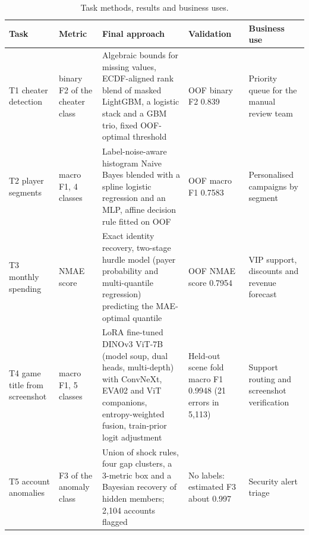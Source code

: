 \begin{table}[H]\centering\scriptsize
\captionsetup{justification=raggedright,singlelinecheck=false}

\begin{tabular}{@{}L{.10\linewidth}L{.12\linewidth}L{.29\linewidth}L{.17\linewidth}L{.21\linewidth}@{}}
\toprule
\textbf{Task} & \textbf{Metric} & \textbf{Final approach} & \textbf{Validation} & \textbf{Business use} \\
\midrule
T1 cheater detection & binary F2 of the cheater class & Algebraic bounds for missing values, ECDF-aligned rank blend of masked LightGBM, a logistic stack and a GBM trio, fixed OOF-optimal threshold & OOF binary F2 0.839 & Priority queue for the manual review team \\
T2 player segments & macro F1, 4 classes & Label-noise-aware histogram Naive Bayes blended with a spline logistic regression and an MLP, affine decision rule fitted on OOF & OOF macro F1 0.7583 & Personalised campaigns by segment \\
T3 monthly spending & NMAE score & Exact identity recovery, two-stage hurdle model (payer probability and multi-quantile regression) predicting the MAE-optimal quantile & OOF NMAE score 0.7954 & VIP support, discounts and revenue forecast \\
T4 game title from screenshot & macro F1, 5 classes & LoRA fine-tuned DINOv3 ViT-7B (model soup, dual heads, multi-depth) with ConvNeXt, EVA02 and ViT companions, entropy-weighted fusion, train-prior logit adjustment & Held-out scene fold macro F1 0.9948 (21 errors in 5,113) & Support routing and screenshot verification \\
T5 account anomalies & F3 of the anomaly class & Union of shock rules, four gap clusters, a 3-metric box and a Bayesian recovery of hidden members; 2,104 accounts flagged & No labels: estimated F3 about 0.997 & Security alert triage \\
\bottomrule
\end{tabular}
\caption{Task methods, results and business uses.}\label{tab:summary-master}
\end{table}

